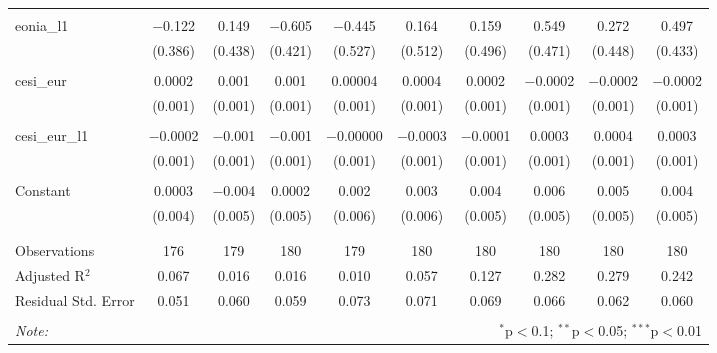 \begin{table}[!htbp]
\begin{adjustbox}{width=1.35\textwidth}
\begin{tabular}{@{\extracolsep{5pt}}lccccccccc}
  & & & & & & & & & \\ 
 eonia\_l1 & $-$0.122 & 0.149 & $-$0.605 & $-$0.445 & 0.164 & 0.159 & 0.549 & 0.272 & 0.497 \\ 
  & (0.386) & (0.438) & (0.421) & (0.527) & (0.512) & (0.496) & (0.471) & (0.448) & (0.433) \\ 
  & & & & & & & & & \\ 
 cesi\_eur & 0.0002 & 0.001 & 0.001 & 0.00004 & 0.0004 & 0.0002 & $-$0.0002 & $-$0.0002 & $-$0.0002 \\ 
  & (0.001) & (0.001) & (0.001) & (0.001) & (0.001) & (0.001) & (0.001) & (0.001) & (0.001) \\ 
  & & & & & & & & & \\ 
 cesi\_eur\_l1 & $-$0.0002 & $-$0.001 & $-$0.001 & $-$0.00000 & $-$0.0003 & $-$0.0001 & 0.0003 & 0.0004 & 0.0003 \\ 
  & (0.001) & (0.001) & (0.001) & (0.001) & (0.001) & (0.001) & (0.001) & (0.001) & (0.001) \\ 
  & & & & & & & & & \\ 
 Constant & 0.0003 & $-$0.004 & 0.0002 & 0.002 & 0.003 & 0.004 & 0.006 & 0.005 & 0.004 \\ 
  & (0.004) & (0.005) & (0.005) & (0.006) & (0.006) & (0.005) & (0.005) & (0.005) & (0.005) \\ 
  & & & & & & & & & \\ 
\hline \\[-1.8ex] 
Observations & 176 & 179 & 180 & 179 & 180 & 180 & 180 & 180 & 180 \\ 
Adjusted R$^{2}$ & 0.067 & 0.016 & 0.016 & 0.010 & 0.057 & 0.127 & 0.282 & 0.279 & 0.242 \\ 
Residual Std. Error & 0.051 & 0.060 & 0.059 & 0.073 & 0.071 & 0.069 & 0.066 & 0.062 & 0.060 \\ 
\hline 
\hline \\[-1.8ex] 
\textit{Note:}  & \multicolumn{9}{r}{$^{*}$p$<$0.1; $^{**}$p$<$0.05; $^{***}$p$<$0.01} \\ 
\end{tabular} 
\end{adjustbox}
\end{table} 

